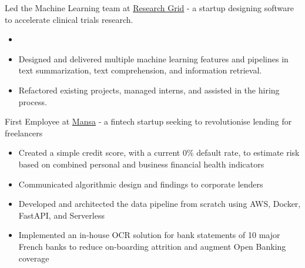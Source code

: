 \documentclass[10pt,a4paper,ragged2em, academicons]{altacv}
\begin{document}

Led the Machine Learning team at \href{https://rgrid.tech/}{Research Grid} - a startup designing software to accelerate clinical trials research.
\begin{itemize}
    \item  
    \item Designed and delivered multiple machine learning features and pipelines in text summarization, text comprehension, and information retrieval.
    \item Refactored existing projects, managed interns, and assisted in the hiring process.
\end{itemize}


First Employee at \href{https://getmansa.com/}{Mansa} - a fintech startup seeking to revolutionise lending for freelancers
\begin{itemize}
    \item Created a simple credit score, with a current 0\% default rate, to estimate risk based on combined personal and business financial health indicators
    \item Communicated algorithmic design and findings to corporate lenders
    \item Developed and architected the data pipeline from scratch using AWS, Docker, FastAPI, and Serverless
    \item Implemented an in-house OCR solution for bank statements of 10 major French banks to reduce on-boarding attrition and augment Open Banking coverage
\end{itemize}
\end{document}

